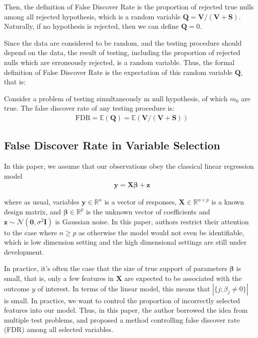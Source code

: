 \documentclass{uwstat572}
\begin{document}
Then, the definition of False Discover Rate is the proportion of rejected true nulls among all rejected hypothesis, which is a random variable $\bm{Q} = \bm{V}/(\bm{V}+\bm{S})$. Naturally, if no hypothesis is rejected, then we can define $\bm{Q} = 0$.

Since the data are considered to be random, and the testing procedure should depend on the data, the result of testing, including the proportion of rejected nulls which are erroneously rejected, is a random variable. Thus, the formal definition of False Discover Rate is the expectation of this random variable $\bm{Q}$, that is:


Consider a problem of testing simultaneously m null hypothesis, of which $m_0$ are true. The false discover rate of any testing procedure is:
\begin{align}
& \text{FDR} = \mathbb{E}(\bm{Q}) = \mathbb{E}(\bm{V}/(\bm{V}+\bm{S}))
\end{align}

\subsection{False Discover Rate in Variable Selection}
In this paper, we assume that our observations obey the classical linear regression model
\begin{align}
& \bm{y} = \bm{X}\bm{\beta}+\bm{z}
\end{align}

where as usual, variables $\bm{y}\in\mathbb{R}^n$ is a vector of responses, $\bm{X}\in \mathbb{R}^{n\times p}$ is a known design matrix, and $\bm{\beta}\in \mathbb{R}^p$ is the unknown vector of coefficients and $\bm{z}\sim \mathcal{N}(\bm{0}, \sigma^2\bm{I})$ is Gaussian noise. In this paper, authors restrict their attention to the case where $n\geq p$ as otherwise the model would not even be identifiable, which is low dimension setting and the high dimensional settings are still under development.

In practice, it's often the case that the size of true support of parameters $\bm{\beta}$ is small, that is, only a few features in $\bm{X}$ are expected to be associated with the outcome $y$ of interest. In terms of the linear model, this means that $|\{j; \beta_j \neq 0 \}|$ is small. In practice, we want to control the proportion of incorrectly selected features into our model. Thus, in this paper, the author borrowed the idea from multiple test problems, and proposed a method controlling false discover rate (FDR) among all selected variables.
\end{document}
